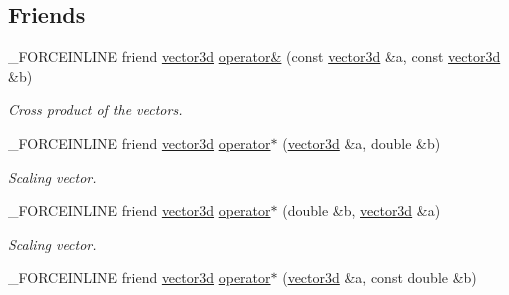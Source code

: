 \subsection*{Friends}
\begin{DoxyCompactItemize}
\item 
\hypertarget{classbt_1_1vector3d_a2fab3b8ac835715ceaa7c74ce2e7294b}{\-\_\-\-F\-O\-R\-C\-E\-I\-N\-L\-I\-N\-E friend \hyperlink{classbt_1_1vector3d}{vector3d} \hyperlink{classbt_1_1vector3d_a2fab3b8ac835715ceaa7c74ce2e7294b}{operator\&} (const \hyperlink{classbt_1_1vector3d}{vector3d} \&a, const \hyperlink{classbt_1_1vector3d}{vector3d} \&b)}\label{classbt_1_1vector3d_a2fab3b8ac835715ceaa7c74ce2e7294b}

\begin{DoxyCompactList}\small\item\em Cross product of the vectors. \end{DoxyCompactList}\item 
\hypertarget{classbt_1_1vector3d_a59644b5d175d0a8ecd12ca019af2b0cb}{\-\_\-\-F\-O\-R\-C\-E\-I\-N\-L\-I\-N\-E friend \hyperlink{classbt_1_1vector3d}{vector3d} \hyperlink{classbt_1_1vector3d_a59644b5d175d0a8ecd12ca019af2b0cb}{operator$\ast$} (\hyperlink{classbt_1_1vector3d}{vector3d} \&a, double \&b)}\label{classbt_1_1vector3d_a59644b5d175d0a8ecd12ca019af2b0cb}

\begin{DoxyCompactList}\small\item\em Scaling vector. \end{DoxyCompactList}\item 
\hypertarget{classbt_1_1vector3d_a723a71c4d5f3117df40bd17796863dda}{\-\_\-\-F\-O\-R\-C\-E\-I\-N\-L\-I\-N\-E friend \hyperlink{classbt_1_1vector3d}{vector3d} \hyperlink{classbt_1_1vector3d_a723a71c4d5f3117df40bd17796863dda}{operator$\ast$} (double \&b, \hyperlink{classbt_1_1vector3d}{vector3d} \&a)}\label{classbt_1_1vector3d_a723a71c4d5f3117df40bd17796863dda}

\begin{DoxyCompactList}\small\item\em Scaling vector. \end{DoxyCompactList}\item 
\hypertarget{classbt_1_1vector3d_a869a04bfd5ea8de560bd54e750b49d4a}{\-\_\-\-F\-O\-R\-C\-E\-I\-N\-L\-I\-N\-E friend \hyperlink{classbt_1_1vector3d}{vector3d} \hyperlink{classbt_1_1vector3d_a869a04bfd5ea8de560bd54e750b49d4a}{operator$\ast$} (\hyperlink{classbt_1_1vector3d}{vector3d} \&a, const double \&b)}\label{classbt_1_1vector3d_a869a04bfd5ea8de560bd54e750b49d4a}


\end{DoxyCompactItemize}
